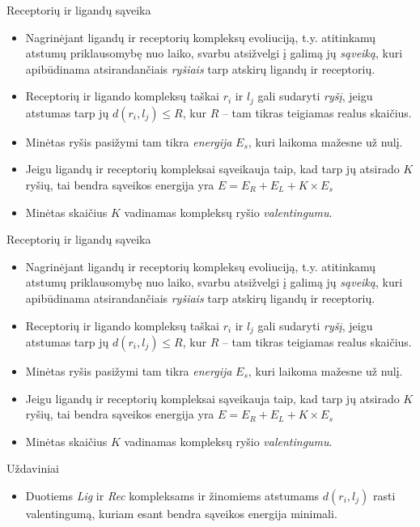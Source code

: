 \documentclass[11pt]{beamer}
\begin{document}
\begin{frame}{Receptorių ir ligandų sąveika }
\begin{itemize}
\item Nagrinėjant ligandų ir receptorių kompleksų evoliuciją, t.y. atitinkamų atstumų priklausomybę nuo laiko, 
svarbu atsižvelgi į galimą jų \textit{sąveiką}, kuri apibūdinama atsirandančiais \textit{ryšiais} tarp atskirų ligandų ir receptorių.
\item Receptorių ir ligando kompleksų taškai $r_i$ ir $l_j$ gali sudaryti \textit{ryšį}, jeigu  atstumas tarp jų 
$d(r_i,l_j) \leqslant R$, kur $R$ -- tam tikras teigiamas realus skaičius. 
\item Minėtas ryšis pasižymi tam tikra \textit{energija} $E_s$, kuri laikoma mažesne už nulį.
\item Jeigu ligandų ir receptorių kompleksai  sąveikauja taip, kad tarp jų atsirado $K$ ryšių, tai bendra sąveikos energija
yra $E = E_R + E_L + K \times E_s$
\item Minėtas skaičius $K$ vadinamas kompleksų ryšio \textit{valentingumu}.
\end{itemize}
\end{frame}



\begin{frame}{Receptorių ir ligandų sąveika }
\begin{itemize}
\item Nagrinėjant ligandų ir receptorių kompleksų evoliuciją, t.y. atitinkamų atstumų priklausomybę nuo laiko, 
svarbu atsižvelgi į galimą jų \textit{sąveiką}, kuri apibūdinama atsirandančiais \textit{ryšiais} tarp atskirų ligandų ir receptorių.
\item Receptorių ir ligando kompleksų taškai $r_i$ ir $l_j$ gali sudaryti \textit{ryšį}, jeigu  atstumas tarp jų 
$d(r_i,l_j) \leqslant R$, kur $R$ -- tam tikras teigiamas realus skaičius. 
\item Minėtas ryšis pasižymi tam tikra \textit{energija} $E_s$, kuri laikoma mažesne už nulį.
\item Jeigu ligandų ir receptorių kompleksai  sąveikauja taip, kad tarp jų atsirado $K$ ryšių, tai bendra sąveikos energija
yra $E = E_R + E_L + K \times E_s$
\item Minėtas skaičius $K$ vadinamas kompleksų ryšio \textit{valentingumu}.
\end{itemize}
\end{frame}





\begin{frame}{Uždaviniai}
\begin{itemize}
\item Duotiems \textit{Lig} ir \textit{Rec} kompleksams ir žinomiems atstumams $d(r_i, l_j)$ rasti valentingumą, kuriam esant bendra sąveikos energija minimali.

\end{itemize}
\end{frame}
\end{document}
